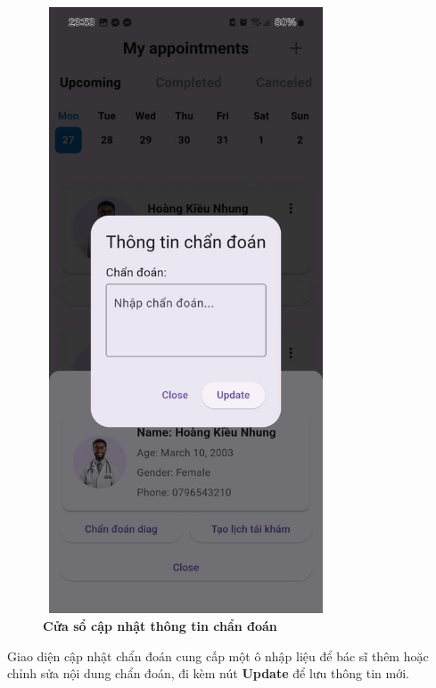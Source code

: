 \begin{figure}[H]
	\centering
	\includegraphics[width=8.5cm,height=18cm]{Images/AppUI/blockInputDIag.jpg}
	\caption[Cửa sổ cập nhật thông tin chẩn đoán]{\bfseries \fontsize{12pt}{0pt}\selectfont Cửa sổ cập nhật thông tin chẩn đoán}
	\label{diagnosisUpdate}
\end{figure}
Giao diện cập nhật chẩn đoán cung cấp một ô nhập liệu để bác sĩ thêm hoặc chỉnh sửa nội dung chẩn đoán, đi kèm nút \textbf{Update} để lưu thông tin mới.


